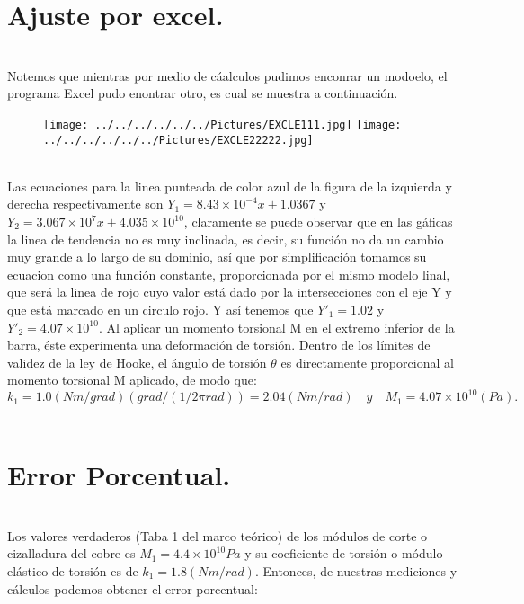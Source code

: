 \documentclass[10pt,a4paper]{article}
\begin{document}
\section*{Ajuste por excel.}\\
Notemos que mientras por medio de c\'{a}alculos pudimos enconrar un modoelo, el programa Excel pudo enontrar otro, es cual se muestra a continuaci\'{o}n.
\\
\begin{figure}[hbtp]
 \centering
\texttt{[image: ../../../../../../Pictures/EXCLE111.jpg]} 
\texttt{[image: ../../../../../../Pictures/EXCLE22222.jpg]}  
\end{figure}
\\
Las ecuaciones para la linea punteada de color azul de la figura de la izquierda y derecha respectivamente son ${ Y }_{ 1 }= { 8.43\times 10 }^{ -4 }x+ 1.0367$ y ${ Y }_{ 2 }= { 3.067\times 10 }^{ 7 }x+ { 4.035\times  10 }^{ 10 }$, claramente se puede observar que en las g\'{a}ficas la linea de tendencia no es muy inclinada, es decir, su funci\'{o}n no da un cambio muy grande a lo largo de su dominio, as\'{i} que por simplificaci\'{o}n tomamos su ecuacion como una funci\'{o}n constante, proporcionada por el mismo modelo linal, que ser\'{a} la linea de rojo cuyo valor est\'{a} dado por la intersecciones con el eje Y y que est\'{a} marcado en un circulo rojo. Y as\'{i} tenemos que ${ Y }'_{ 1 }= 1.02$ y ${ Y }'_{ 2 }=4.07\times { 10 }^{ 10 }$. Al aplicar un momento torsional M en el extremo inferior de la barra, \'{e}ste experimenta una deformaci\'{o}n de torsi\'{o}n. Dentro de los l\'{i}mites de validez de la ley de Hooke, el \'{a}ngulo de torsi\'{o}n $\theta$ es directamente proporcional al momento torsional M aplicado, de modo que:
\[{ k }_{ 1 }= 1.0(Nm/grad)\left( { grad }/{ \left( { 1 }/{ 2\pi rad } \right)  } \right)=2.04(Nm/rad)\quad y \quad { M }_{ 1 }=4.07\times { 10 }^{ 10 }(Pa).\]
\\
\section*{Error Porcentual.}\\
Los valores verdaderos (Taba 1 del marco te\'{o}rico) de los m\'{o}dulos de corte o cizalladura del cobre es ${ M }_{ 1 }=4.4\times { 10 }^{ 10 }Pa$ y su  coeficiente de torsi\'{o}n o m\'{o}dulo el\'{a}stico de torsi\'{o}n es de ${ k }_{ 1 }=1.8(Nm/rad)$. Entonces, de nuestras mediciones y c\'{a}lculos podemos obtener el error porcentual:
\end{document}
